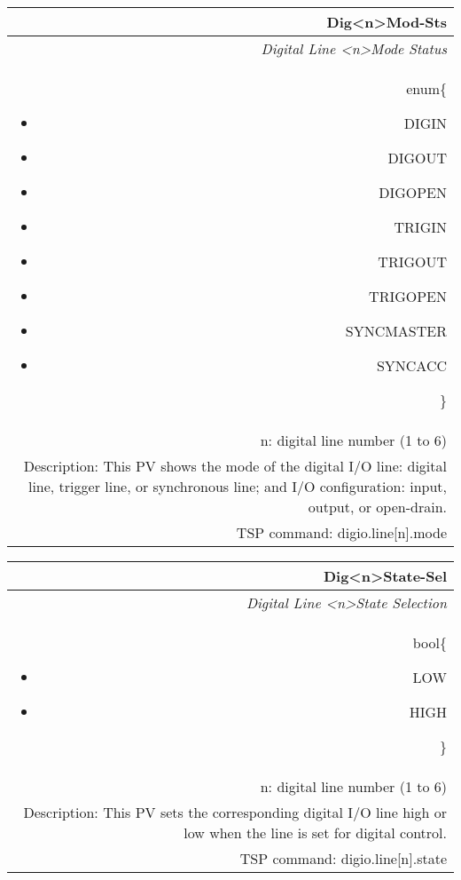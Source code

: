\documentclass[openany]{article}
\begin{document}
		\begin{tabular}{N}
			\hline
			\bfseries Dig{\textless n\textgreater}Mod-Sts\label{pv:digmod-sts} \\ \hline
			\emph{Digital Line \textless n\textgreater Mode Status} \\
			enum\{\begin{itemize}[noitemsep]
				\small
				\item[] DIGIN
				\item[] DIGOUT
				\item[] DIGOPEN
				\item[] TRIGIN
				\item[] TRIGOUT
				\item[] TRIGOPEN
				\item[] SYNCMASTER
				\item[] SYNCACC
			\end{itemize}\} \\
			n: digital line number (1 to 6) \\
			Description: This PV shows the mode of the digital I/O line: digital line, trigger line, or synchronous line; and I/O configuration: input, output, or open-drain. \\
			TSP command: digio.line[n].mode
		\end{tabular}

		\begin{tabular}{N}
			\hline
			\bfseries Dig{\textless n\textgreater}State-Sel\label{pv:digstate-sel} \\ \hline
			\emph{Digital Line \textless n\textgreater State Selection} \\
			bool\{\begin{itemize}[noitemsep]
				\small
				\item[] LOW
				\item[] HIGH
			\end{itemize}\} \\
			n: digital line number (1 to 6) \\
			Description: This PV sets the corresponding digital I/O line high or low when the line is set for digital control. \\
			TSP command: digio.line[n].state
		\end{tabular}
\end{document}
